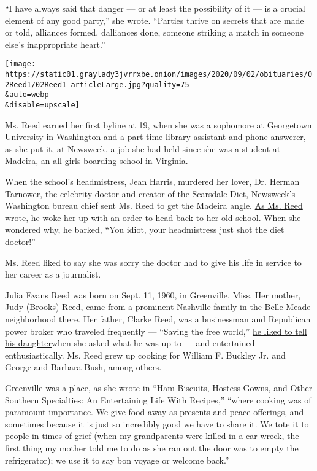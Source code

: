 ``I have always said that danger --- or at least the possibility of it
--- is a crucial element of any good party,'' she wrote. ``Parties
thrive on secrets that are made or told, alliances formed, dalliances
done, someone striking a match in someone else's inappropriate heart.''

\texttt{[image: https://static01.graylady3jvrrxbe.onion/images/2020/09/02/obituaries/02Reed1/02Reed1-articleLarge.jpg?quality=75\\\&auto=webp\\\&disable=upscale]}

Ms. Reed earned her first byline at 19, when she was a sophomore at
Georgetown University in Washington and a part-time library assistant
and phone answerer, as she put it, at Newsweek, a job she had held since
she was a student at Madeira, an all-girls boarding school in Virginia.

When the school's headmistress, Jean Harris, murdered her lover, Dr.
Herman Tarnower, the celebrity doctor and creator of the Scarsdale Diet,
Newsweek's Washington bureau chief sent Ms. Reed to get the Madeira
angle.
\href{https://gardenandgun.com/articles/the-high-the-low-good-country-bad-behavior/}{As
Ms. Reed wrote}, he woke her up with an order to head back to her old
school. When she wondered why, he barked, ``You idiot, your headmistress
just shot the diet doctor!''

Ms. Reed liked to say she was sorry the doctor had to give his life in
service to her career as a journalist.

Julia Evans Reed was born on Sept. 11, 1960, in Greenville, Miss. Her
mother, Judy (Brooks) Reed, came from a prominent Nashville family in
the Belle Meade neighborhood there. Her father, Clarke Reed, was a
businessman and Republican power broker who traveled frequently ---
``Saving the free world,''
\href{https://www.nytimes3xbfgragh.onion/2004/08/30/us/republicans-convention-new-york-apple-s-almanac-father-southern-strategy-76-here.html}{he
liked to tell his daughter}when she asked what he was up to --- and
entertained enthusiastically. Ms. Reed grew up cooking for William F.
Buckley Jr. and George and Barbara Bush, among others.

Greenville was a place, as she wrote in ``Ham Biscuits, Hostess Gowns,
and Other Southern Specialties: An Entertaining Life With Recipes,''
``where cooking was of paramount importance. We give food away as
presents and peace offerings, and sometimes because it is just so
incredibly good we have to share it. We tote it to people in times of
grief (when my grandparents were killed in a car wreck, the first thing
my mother told me to do as she ran out the door was to empty the
refrigerator); we use it to say bon voyage or welcome back.''

